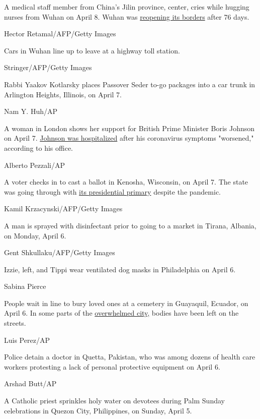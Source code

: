 A medical staff member from China's Jilin province, center, cries while
hugging nurses from Wuhan on April 8. Wuhan was
\href{https://www.cnn.com/2020/04/07/asia/coronavirus-wuhan-lockdown-lifted-intl-hnk/index.html}{reopening
its borders} after 76 days.

Hector Retamal/AFP/Getty Images

Cars in Wuhan line up to leave at a highway toll station.

Stringer/AFP/Getty Images

Rabbi Yaakov Kotlarsky places Passover Seder to-go packages into a car
trunk in Arlington Heights, Illinois, on April 7.

Nam Y. Huh/AP

A woman in London shows her support for British Prime Minister Boris
Johnson on April 7.
\href{https://www.cnn.com/2020/04/06/uk/boris-johnson-coronavirus-hospital-gbr-intl/index.html}{Johnson
was hospitalized} after his coronavirus symptoms "worsened," according
to his office.

Alberto Pezzali/AP

A voter checks in to cast a ballot in Kenosha, Wisconsin, on April 7.
The state was going through with
\href{https://www.cnn.com/2020/04/07/politics/wisconsin-primary-coronavirus/index.html}{its
presidential primary} despite the pandemic.

Kamil Krzacynski/AFP/Getty Images

A man is sprayed with disinfectant prior to going to a market in Tirana,
Albania, on Monday, April 6.

Gent Shkullaku/AFP/Getty Images

Izzie, left, and Tippi wear ventilated dog masks in Philadelphia on
April 6.

Sabina Pierce

People wait in line to bury loved ones at a cemetery in Guayaquil,
Ecuador, on April 6. In some parts of the
\href{https://edition.cnn.com/2020/04/03/americas/guayaquil-ecuador-overwhelmed-coronavirus-intl/index.html}{overwhelmed
city,} bodies have been left on the streets.

Luis Perez/AP

Police detain a doctor in Quetta, Pakistan, who was among dozens of
health care workers protesting a lack of personal protective equipment
on April 6.

Arshad Butt/AP

A Catholic priest sprinkles holy water on devotees during Palm Sunday
celebrations in Quezon City, Philippines, on Sunday, April 5.

